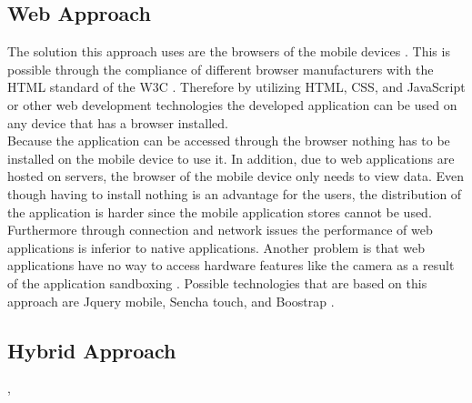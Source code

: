 \documentclass[Bachelor,BIF,english]{twbook}
\begin{document}
\subsection{Web Approach}
The solution this approach uses are the browsers of the mobile devices \cite[p.~2]{7934674}. This is possible through the compliance of different browser manufacturers with the HTML standard of the W3C \cite[p.~2]{LinckArne2016}. Therefore by utilizing HTML, CSS, and JavaScript or other web development technologies the developed application can be used on any device that has a browser installed.
\\[\baselineskip]
Because the application can be accessed through the browser nothing has to be installed on the mobile device to use it. In addition, due to web applications are hosted on servers, the browser of the mobile device only needs to view data. Even though having to install nothing is an advantage for the users, the distribution of the application is harder since the mobile application stores cannot be used. Furthermore through connection and network issues the performance of web applications is inferior to native applications. Another problem is that web applications have no way to access hardware features like the camera as a result of the application sandboxing \cite[p.~626]{6420693}. Possible technologies that are based on this approach are Jquery mobile, Sencha touch, and Boostrap \cite[p.~2]{7934674}.

\subsection{Hybrid Approach}
\cite{7479278}, \cite{7934674}
\end{document}

